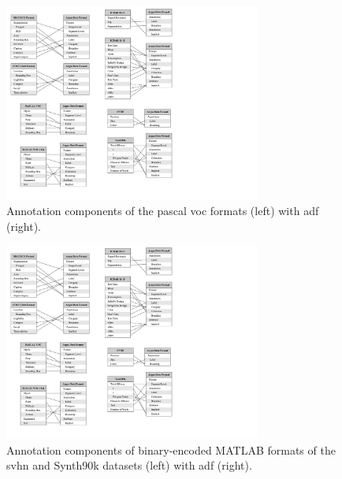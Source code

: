 \begin{figure}[p]
  \centering
  \includegraphics[width=0.75\textwidth]{images/dataset/mapping/pascal_format}
  \caption[Mapping the PASCAL VOC annotation formats to ADF]{Annotation components of the \gls{pascal} \gls{voc} formats (left) with \gls{adf} (right).}
  \label{fig:dataset:metamodel_evaluation:mapping:pascal}
\end{figure}

\begin{figure}[p]
  \centering
  \includegraphics[width=0.75\textwidth]{images/dataset/mapping/matlab_format}
  \caption[Mapping the binarised MATLAB format to ADF]{Annotation components of binary-encoded MATLAB formats of the \gls{svhn} and Synth90k datasets (left) with \gls{adf} (right).}
  \label{fig:dataset:metamodel_evaluation:mapping:matlab}
\end{figure}